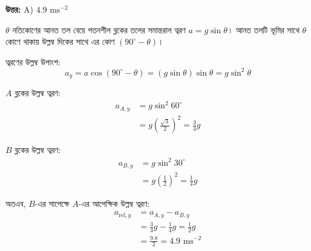 \documentclass[12pt, a4paper]{article}
\begin{document}
\vspace{0.5em}
\begin{tcolorbox}[answerbox]
    \textbf{\color{success} উত্তর:} A)  $4.9\text{ ms}^{-2}$
\end{tcolorbox}
\vspace{1em}

\begin{tcolorbox}[solutionbox={সমাধান (Solution)}]
    \noindent
    $\theta$ নতিকোণের আনত তল বেয়ে পতনশীল ব্লকের তলের সমান্তরাল ত্বরণ $a = g \sin\theta$।
    আনত তলটি ভূমির সাথে $\theta$ কোণে থাকায় উল্লম্ব দিকের সাথে এর কোণ $(90^\circ - \theta)$।
    
    ত্বরণের উল্লম্ব উপাংশ:
    \[ a_y = a \cos(90^\circ - \theta) = (g \sin\theta) \sin\theta = g \sin^2\theta \]
    
    $A$ ব্লকের উল্লম্ব ত্বরণ:
    \begin{align*}
        a_{A,y} &= g \sin^2 60^\circ \\
                &= g \left(\frac{\sqrt{3}}{2}\right)^2 = \frac{3}{4}g
    \end{align*}
    
    $B$ ব্লকের উল্লম্ব ত্বরণ:
    \begin{align*}
        a_{B,y} &= g \sin^2 30^\circ \\
                &= g \left(\frac{1}{2}\right)^2 = \frac{1}{4}g
    \end{align*}
    
    অতএব, $B$-এর সাপেক্ষে $A$-এর আপেক্ষিক উল্লম্ব ত্বরণ:
    \begin{align*}
        a_{\text{rel}, y} &= a_{A,y} - a_{B,y} \\
                          &= \frac{3}{4}g - \frac{1}{4}g = \frac{1}{2}g \\
                          &= \frac{9.8}{2} = \mathbf{4.9}\text{ ms}^{-2}
    \end{align*}
\end{tcolorbox}

\newpage
\end{document}
